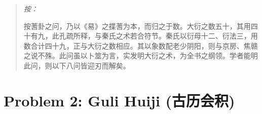 \documentclass[11pt,a4paper]{article}
\newenvironment{editorial}{%
  \small\begin{quote}\color{prefacecolor}\textit{按：}%
}{\end{quote}\normalsize}
\newcommand{\zhtext}[1]{{\chinese #1}}
\begin{document}
\begin{editorial}
按蓍卦之问，乃以《易》之揲蓍为本，而归之于数。大衍之数五十，其用四十有九，此孔疏所释，与秦氏之术若合符节。秦氏以衍母十二、衍法三，用数合计四十九，正与大衍之数相应。其以象数配老少阴阳，则与京房、焦赣之说不殊。此问虽以卜筮为言，实发明大衍之术，为全书之纲领。学者能明此问，则以下八问皆迎刃而解矣。
\end{editorial}

\newpage

\section{Problem 2: Guli Huiji (\zhtext{古历会积})}
\end{document}
